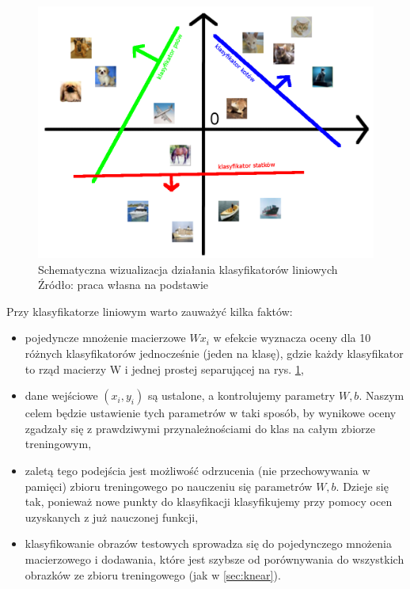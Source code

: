 \begin{figure}[h!tb]
	 \centering
	 \includegraphics[width = 0.75\linewidth]{img/klas_cartoon}
	 \caption{Schematyczna wizualizacja działania klasyfikatorów liniowych \\
              Źródło: praca własna na podstawie \cite{cs231n}}
	 \label{fig:cartoon_class}
\end{figure}

Przy klasyfikatorze liniowym warto zauważyć kilka faktów:
\begin{itemize}
	\item pojedyncze mnożenie macierzowe $Wx_i$ w efekcie wyznacza oceny dla 10 różnych klasyfikatorów jednocześnie (jeden na klasę), gdzie każdy klasyfikator to rząd macierzy W i jednej prostej separującej na rys. \ref{fig:cartoon_class},
	\item dane wejściowe $(x_i,y_i)$ są ustalone, a kontrolujemy parametry $W,b$. Naszym celem będzie ustawienie tych parametrów w taki sposób, by wynikowe oceny zgadzały się z prawdziwymi przynależnościami do klas na całym zbiorze treningowym,
	\item zaletą tego podejścia jest możliwość odrzucenia (nie przechowywania w pamięci) zbioru treningowego po nauczeniu się parametrów $W,b$. Dzieje się tak, ponieważ nowe punkty do klasyfikacji klasyfikujemy przy pomocy ocen uzyskanych z już nauczonej funkcji,
	\item klasyfikowanie obrazów testowych sprowadza się do pojedynczego mnożenia macierzowego i dodawania, które jest szybsze od porównywania do wszystkich obrazków ze zbioru treningowego (jak w \ref{sec:knear}).
\end{itemize}

